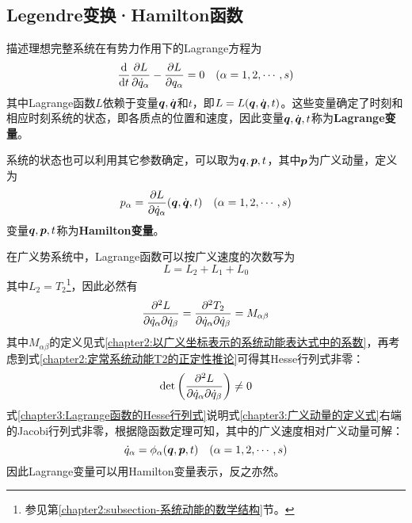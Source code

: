 \subsection{Legendre变换·Hamilton函数}

描述理想完整系统在有势力作用下的Lagrange方程为
\begin{equation}
	\frac{\mathrm{d}}{\mathrm{d} t} \frac{\partial L}{\partial \dot{q}_\alpha} - \frac{\partial L}{\partial q_\alpha} = 0 \quad (\alpha = 1,2,\cdots,s)
	\label{chapter3:Lagrange方程-重写}
\end{equation}
其中Lagrange函数$L$依赖于变量$\boldsymbol{q},\dot{\boldsymbol{q}}$和$t$，即$L = L(\boldsymbol{q},\dot{\boldsymbol{q}},t)$。这些变量确定了时刻和相应时刻系统的状态，即各质点的位置和速度，因此变量$\boldsymbol{q},\dot{\boldsymbol{q}},t$称为{\bf Lagrange变量}。

系统的状态也可以利用其它参数确定，可以取为$\boldsymbol{q},\boldsymbol{p},t$，其中$\boldsymbol{p}$为广义动量，定义为
\begin{equation}
	p_\alpha = \frac{\partial L}{\partial \dot{q}_\alpha}(\boldsymbol{q},\dot{\boldsymbol{q}},t)\quad (\alpha=1,2,\cdots,s)
	\label{chapter3:广义动量的定义式}
\end{equation}
变量$\boldsymbol{q},\boldsymbol{p},t$称为{\bf Hamilton变量}。

在广义势系统中，Lagrange函数可以按广义速度的次数写为
\begin{equation*}
	L = L_2+L_1+L_0
\end{equation*}
其中$L_2=T_2$\footnote{参见第\ref{chapter2:subsection-系统动能的数学结构}节。}，因此必然有
\begin{equation}
	\frac{\partial^2 L}{\partial \dot{q}_\alpha\partial \dot{q}_\beta} = \frac{\partial^2 T_2}{\partial \dot{q}_\alpha\partial \dot{q}_\beta} = M_{\alpha\beta}
\end{equation}
其中$M_{\alpha\beta}$的定义见式\eqref{chapter2:以广义坐标表示的系统动能表达式中的系数}，再考虑到式\eqref{chapter2:定常系统动能T2的正定性推论}可得其Hesse行列式非零：
\begin{equation}
	\det\begin{pmatrix} \dfrac{\partial^2 L}{\partial \dot{q}_\alpha\partial \dot{q}_\beta} \end{pmatrix} \neq 0
	\label{chapter3:Lagrange函数的Hesse行列式}
\end{equation}
式\eqref{chapter3:Lagrange函数的Hesse行列式}说明式\eqref{chapter3:广义动量的定义式}右端的Jacobi行列式非零，根据隐函数定理可知，其中的广义速度相对广义动量可解：
\begin{equation}
	\dot{q}_\alpha = \phi_\alpha(\boldsymbol{q},\boldsymbol{p},t)\quad (\alpha=1,2,\cdots,s)
\end{equation}
因此Lagrange变量可以用Hamilton变量表示，反之亦然。

